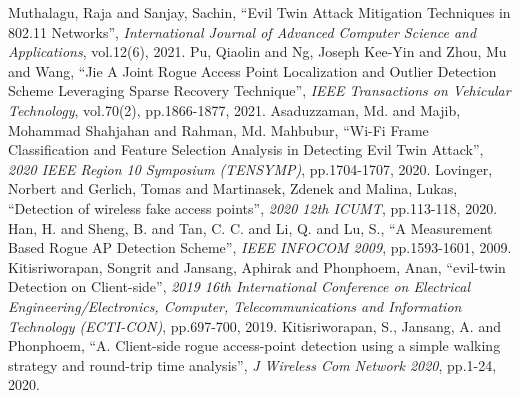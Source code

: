 \documentclass[conference]{IEEEtran}
\begin{document}
\begin{thebibliography}{9}
Muthalagu, Raja and Sanjay, Sachin, ``Evil Twin Attack Mitigation Techniques in 802.11 Networks'', {\it International Journal of Advanced Computer Science and Applications}, vol.12(6), 2021.
Pu, Qiaolin and Ng, Joseph Kee-Yin and Zhou, Mu and Wang, ``Jie A Joint Rogue Access Point Localization and Outlier Detection Scheme Leveraging Sparse Recovery Technique'', {\it IEEE Transactions on Vehicular Technology}, vol.70(2), pp.1866-1877, 2021.
Asaduzzaman, Md. and Majib, Mohammad Shahjahan and Rahman, Md. Mahbubur, ``Wi-Fi Frame Classification and Feature Selection Analysis in Detecting Evil Twin Attack'', {\it 2020 IEEE Region 10 Symposium (TENSYMP)}, pp.1704-1707, 2020.
Lovinger, Norbert and Gerlich, Tomas and Martinasek, Zdenek and Malina, Lukas, ``Detection of wireless fake access points'', {\it 2020 12th ICUMT}, pp.113-118, 2020.
Han, H. and Sheng, B. and Tan, C. C. and Li, Q. and Lu, S., ``A Measurement Based Rogue AP Detection Scheme'', {\it IEEE INFOCOM 2009}, pp.1593-1601, 2009.
Kitisriworapan, Songrit and Jansang, Aphirak and Phonphoem, Anan, ``evil-twin Detection on Client-side'', {\it 2019 16th International Conference on Electrical Engineering/Electronics, Computer, Telecommunications and Information Technology (ECTI-CON)}, pp.697-700, 2019.
Kitisriworapan, S., Jansang, A. and Phonphoem, ``A. Client-side rogue access-point detection using a simple walking strategy and round-trip time analysis'', {\it J Wireless Com Network 2020}, pp.1-24, 2020.
\end{thebibliography}
\end{document}
